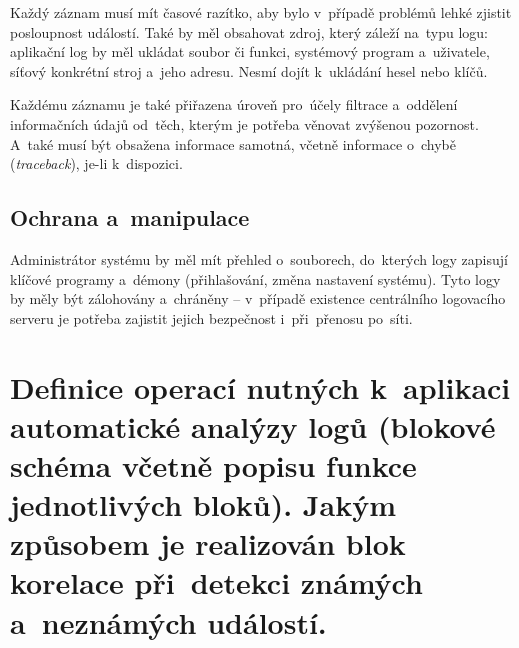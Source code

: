 Každý záznam musí mít časové razítko, aby bylo v~případě problémů lehké zjistit posloupnost událostí. Také by měl obsahovat zdroj, který záleží na~typu logu: aplikační log by měl ukládat soubor či funkci, systémový program a~uživatele, síťový konkrétní stroj a~jeho adresu. Nesmí dojít k~ukládání hesel nebo klíčů.

Každému záznamu je také přiřazena úroveň pro~účely filtrace a~oddělení informačních údajů od~těch, kterým je potřeba věnovat zvýšenou pozornost. A~také musí být obsažena informace samotná, včetně informace o~chybě (\emph{traceback}), je-li k~dispozici.

\subsection{Ochrana a~manipulace}

Administrátor systému by měl mít přehled o~souborech, do~kterých logy zapisují klíčové programy a~démony (přihlašování, změna nastavení systému). Tyto logy by měly být zálohovány a~chráněny -- v~případě existence centrálního logovacího serveru je potřeba zajistit jejich bezpečnost i~při~přenosu po~síti.

\clearpage
\section{Definice operací nutných k~aplikaci automatické analýzy logů (blokové schéma včetně popisu funkce jednotlivých bloků). Jakým způsobem je realizován blok korelace při~detekci známých a~neznámých událostí.}

\begin{figure}
\end{figure}

